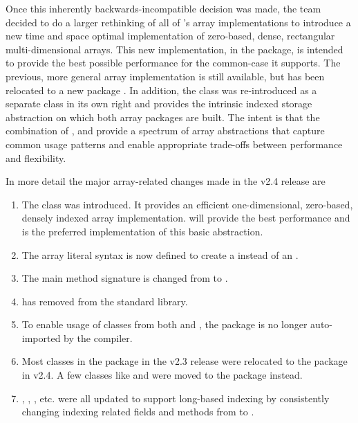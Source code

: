 Once this inherently backwards-incompatible decision was made, the
\Xten{} team decided to do a larger rethinking of all of \Xten{}'s
array implementations to introduce a new time and space optimal
implementation of zero-based, dense, rectangular multi-dimensional
arrays.  This new implementation, in the  package, is
intended to provide the best possible performance for the common-case
it supports.  The previous, more general array implementation is still
available, but has been relocated to a new package
.  In addition, the 
class was re-introduced as a separate class in its own right and
provides the intrinsic indexed storage abstraction on which both array
packages are built.  The intent is that the combination of ,
 and  provide a spectrum of array
abstractions that capture common usage patterns and enable appropriate
trade-offs between performance and flexibility. 

In more detail the major array-related changes made in the \Xten{}
v2.4 release are 
\begin{enumerate}
\item The class  was introduced.  It provides
  an efficient one-dimensional, zero-based, densely indexed array
  implementation.  will provide the best performance and is
  the preferred implementation of this basic abstraction. 
\item The array literal syntax \xcd{[1,2,3]} is now defined to create
  a  instead of an . 
\item The main method signature is changed from  to
  . 
\item {} has removed from the \Xten{}
  standard library.
\item To enable usage of classes from both  and
  , the package  is no longer
  auto-imported by the \Xten{} compiler.
\item Most classes in the  package in the \Xten{} v2.3
  release were relocated to the  package in
  v2.4. A few classes like  and  were moved
  to the  package instead.
\item {}, , , etc. were all updated to
  support long-based indexing by consistently changing indexing
  related fields and methods from  to . 
\end{enumerate}

